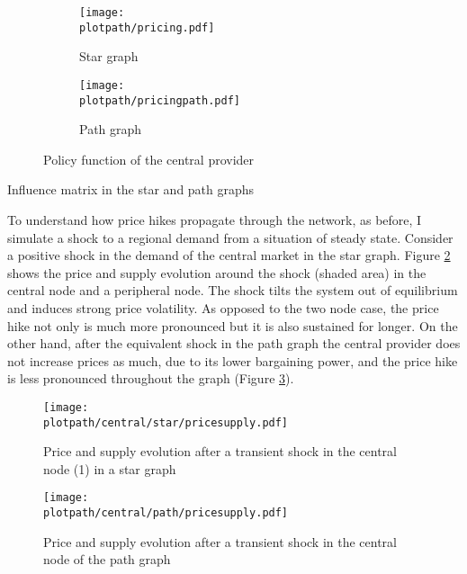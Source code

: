 \begin{center}
  \begin{figure}[H]
    \begin{subfigure}{0.475\textwidth}
      \centering
      \texttt{[image: \\plotpath/pricing.pdf]}
      \caption{Star graph}
    \end{subfigure}
    \hfill
    \begin{subfigure}{0.475\textwidth}
      \centering
      \texttt{[image: \\plotpath/pricingpath.pdf]}
      \caption{Path graph}
    \end{subfigure}
    \caption{Policy function of the central provider}
    \label{fig:p}
  \end{figure}


  \begin{table}[H]
    \centering
    
    \caption{Influence matrix in the star and path graphs}
    \label{table:influence}
  \end{table}
\end{center}



To understand how price hikes propagate through the network, as before, I simulate a shock to a regional demand from a situation of steady state. Consider a positive shock in the demand of the central market in the star graph. Figure \ref{fig:transshockcen_star} shows the price and supply evolution around the shock (shaded area) in the central node and a peripheral node. The shock tilts the system out of equilibrium and induces strong price volatility. As opposed to the two node case, the price hike not only is much more pronounced but it is also sustained for longer. On the other hand, after the equivalent shock in the path graph the central provider does not increase prices as much, due to its lower bargaining power, and the price hike is less pronounced throughout the graph (Figure \ref{fig:transshockcen_path}).

\newpage
\begin{figure}[H]
  \centering
  \texttt{[image: \\plotpath/central/star/pricesupply.pdf]}
  \caption{Price and supply evolution after a transient shock in the central node (1) in a star graph} \label{fig:transshockcen_star}
\end{figure}

\begin{figure}[H]
  \centering
  \texttt{[image: \\plotpath/central/path/pricesupply.pdf]}
  \caption{Price and supply evolution after a transient shock in the central node of the path graph} \label{fig:transshockcen_path}
\end{figure}
\newpage

